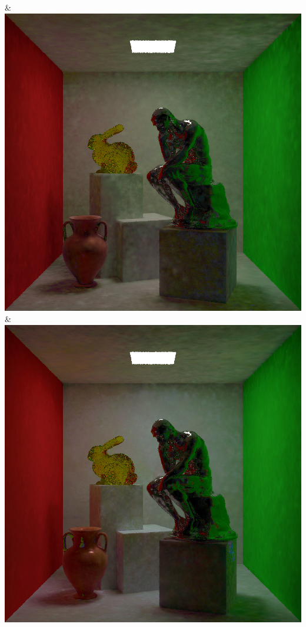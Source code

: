 & \includegraphics[width=\linewidth]{figures/py/tests/batch_size/100+nrc+pt+16_1spp.png}
& \includegraphics[width=\linewidth]{figures/py/tests/batch_size/500+nrc+pt+16_1spp.png}
